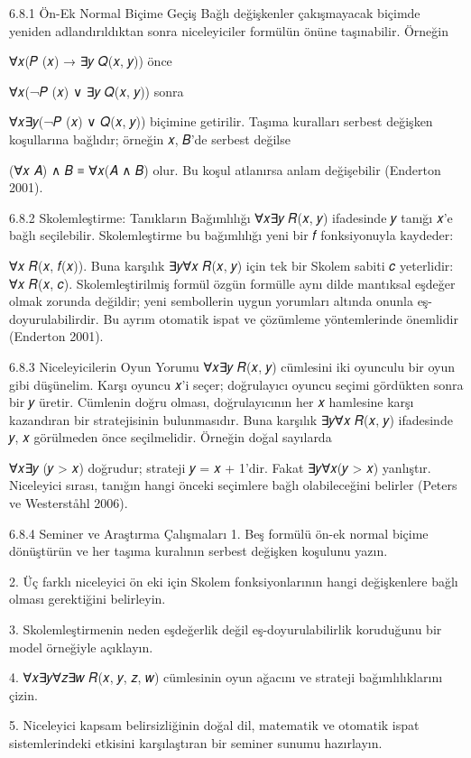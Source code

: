 6.8.1 Ön-Ek Normal Biçime Geçiş Bağlı değişkenler çakışmayacak biçimde yeniden adlandırıldıktan sonra niceleyiciler formülün önüne taşınabilir. Örneğin

∀𝑥(𝑃 (𝑥) → ∃𝑦 𝑄(𝑥, 𝑦)) önce

∀𝑥(¬𝑃 (𝑥) ∨ ∃𝑦 𝑄(𝑥, 𝑦)) sonra

∀𝑥∃𝑦(¬𝑃 (𝑥) ∨ 𝑄(𝑥, 𝑦)) biçimine getirilir. Taşıma kuralları serbest değişken koşullarına bağlıdır; örneğin 𝑥, 𝐵’de serbest değilse

(∀𝑥 𝐴) ∧ 𝐵 ≡ ∀𝑥(𝐴 ∧ 𝐵) olur. Bu koşul atlanırsa anlam değişebilir (Enderton 2001).

6.8.2 Skolemleştirme: Tanıkların Bağımlılığı ∀𝑥∃𝑦 𝑅(𝑥, 𝑦) ifadesinde 𝑦 tanığı 𝑥’e bağlı seçilebilir. Skolemleştirme bu bağımlılığı yeni bir 𝑓 fonksiyonuyla kaydeder:

∀𝑥 𝑅(𝑥, 𝑓(𝑥)). Buna karşılık ∃𝑦∀𝑥 𝑅(𝑥, 𝑦) için tek bir Skolem sabiti 𝑐 yeterlidir: ∀𝑥 𝑅(𝑥, 𝑐). Skolemleştirilmiş formül özgün formülle aynı dilde mantıksal eşdeğer olmak zorunda değildir; yeni sembollerin uygun yorumları altında onunla eş-doyurulabilirdir. Bu ayrım otomatik ispat ve çözümleme yöntemlerinde önemlidir (Enderton 2001).

6.8.3 Niceleyicilerin Oyun Yorumu ∀𝑥∃𝑦 𝑅(𝑥, 𝑦) cümlesini iki oyunculu bir oyun gibi düşünelim. Karşı oyuncu 𝑥’i seçer; doğrulayıcı oyuncu seçimi gördükten sonra bir 𝑦 üretir. Cümlenin doğru olması, doğrulayıcının her 𝑥 hamlesine karşı kazandıran bir stratejisinin bulunmasıdır. Buna karşılık ∃𝑦∀𝑥 𝑅(𝑥, 𝑦) ifadesinde 𝑦, 𝑥 görülmeden önce seçilmelidir. Örneğin doğal sayılarda

∀𝑥∃𝑦 (𝑦 > 𝑥) doğrudur; strateji 𝑦 = 𝑥 + 1’dir. Fakat ∃𝑦∀𝑥(𝑦 > 𝑥) yanlıştır. Niceleyici sırası, tanığın hangi önceki seçimlere bağlı olabileceğini belirler (Peters ve Westerståhl 2006).

6.8.4 Seminer ve Araştırma Çalışmaları 1. Beş formülü ön-ek normal biçime dönüştürün ve her taşıma kuralının serbest değişken koşulunu yazın.

2. Üç farklı niceleyici ön eki için Skolem fonksiyonlarının hangi değişkenlere bağlı olması gerektiğini belirleyin.

3. Skolemleştirmenin neden eşdeğerlik değil eş-doyurulabilirlik koruduğunu bir model örneğiyle açıklayın.

4. ∀𝑥∃𝑦∀𝑧∃𝑤 𝑅(𝑥, 𝑦, 𝑧, 𝑤) cümlesinin oyun ağacını ve strateji bağımlılıklarını çizin.

5. Niceleyici kapsam belirsizliğinin doğal dil, matematik ve otomatik ispat sistemlerindeki etkisini karşılaştıran bir seminer sunumu hazırlayın.

